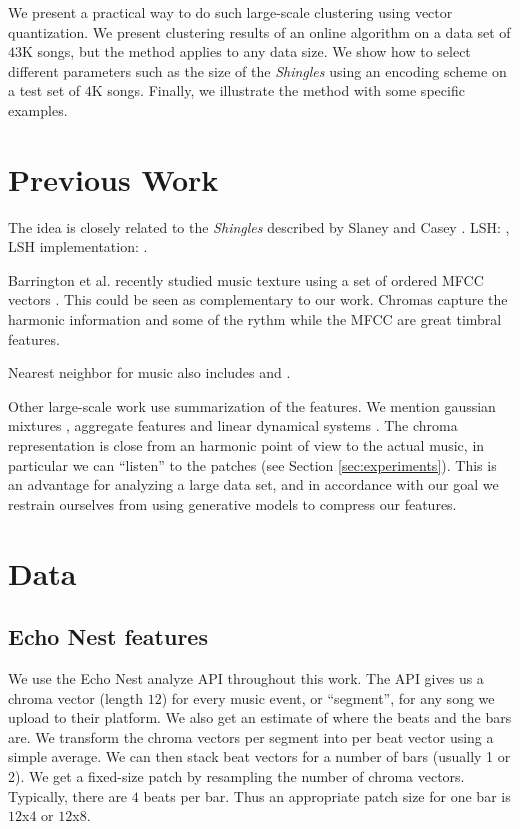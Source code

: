 \documentclass{article}
\begin{document}
We present a practical way to do such large-scale clustering using vector
quantization. We present clustering results of an online algorithm on a data 
set of $43$K songs, but the method applies to any data size. We show how to
select different parameters such as the size of the \textit{Shingles} 
using an encoding scheme on a test set of $4$K songs. Finally, we illustrate
the method with some specific examples.


\section{Previous Work}\label{sec:prevwork}
The idea is closely related to the \textit{Shingles} described by
Slaney and Casey \cite{Casey2006,Casey2007,Casey2008}. 
LSH: \cite{Datar2004}, LSH implementation: \cite{E2LSH}.

Barrington et al. recently studied music texture using a set of ordered
MFCC vectors \cite{Barrington2009a}. This could be seen as complementary
to our work. Chromas capture the harmonic information and some of the
rythm while the MFCC are great timbral features.

Nearest neighbor for music also includes \cite{Cano2004} and
\cite{Holzapfel2009}.

Other large-scale work use summarization of the features. We mention 
gaussian mixtures \cite{Mandel2005}, aggregate features \cite{Bergstra2006a}
and linear dynamical systems \cite{Barrington2009a}. The chroma representation
is close from an harmonic point of view to the actual music, in particular
we can ``listen'' to the patches (see Section \ref{sec:experiments}).
This is an advantage for analyzing a large data set, and in accordance with our goal
we restrain ourselves from using generative models to compress our features.


\section{Data}\label{sec:data}

\subsection{Echo Nest features}
We use the Echo Nest analyze API \cite{EchoNest} throughout this work.
The API gives us a chroma vector (length $12$) for every music event, 
or ``segment'', for any song we upload to their platform. 
We also get an estimate of where the beats and the bars are. 
We transform the chroma vectors per segment into per beat vector using a 
simple average. We can then stack beat vectors for a number of bars (usually 1 or 2). 
We get a fixed-size patch by resampling the number of chroma vectors. Typically,
there are $4$ beats per bar. Thus an appropriate patch size for one bar
is $12$x$4$ or $12$x$8$.
\end{document}
